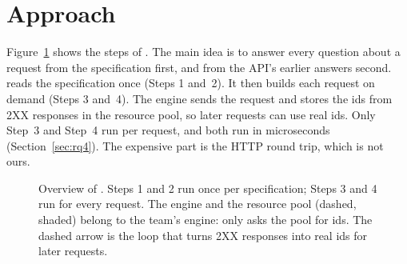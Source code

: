 \section{Approach}
\label{sec:approach}

Figure~\ref{fig:overview} shows the steps of \tool. The main idea is to
answer every question about a request from the specification first, and from
the API's earlier answers second. \tool reads the specification once (Steps 1
and~2). It then builds each request on demand (Steps 3 and~4). The engine
sends the request and stores the ids from 2XX responses in the resource pool,
so later requests can use real ids. Only Step~3 and Step~4 run per request,
and both run in microseconds (Section~\ref{sec:rq4}). The expensive part is
the HTTP round trip, which is not ours.

\begin{figure}[t]
  \centering
  
  \caption{Overview of \tool. Steps 1 and 2 run once per specification;
    Steps 3 and 4 run for every request. The engine and the resource pool
    (dashed, shaded) belong to the team's engine: \tool only asks the pool
    for ids. The dashed arrow is the loop that turns 2XX responses into
    real ids for later requests.}
  \label{fig:overview}
\end{figure}

